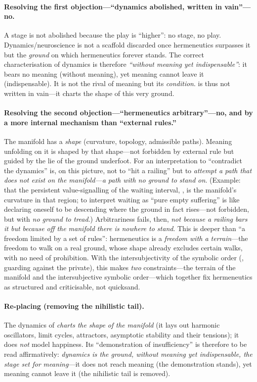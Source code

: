 \paragraph{Resolving the first objection---``dynamics abolished, written in vain''---no.} A stage is not abolished because the play is ``higher'': no stage, no play. Dynamics/neuroscience is not a scaffold discarded once hermeneutics surpasses it but the \emph{ground} on which hermeneutics forever stands. The correct characterisation of dynamics is therefore \emph{``without meaning yet indispensable''}: it bears no meaning (without meaning), yet meaning cannot leave it (indispensable). It is not the rival of meaning but its \emph{condition}.  is thus not written in vain---it charts the shape of this very ground.

\paragraph{Resolving the second objection---``hermeneutics arbitrary''---no, and by a more internal mechanism than ``external rules.''} The manifold has a \emph{shape} (curvature, topology, admissible paths). Meaning unfolding on it is shaped by that shape---not forbidden by external rule but guided by the lie of the ground underfoot. For an interpretation to ``contradict the dynamics'' is, on this picture, not to ``hit a railing'' but to \emph{attempt a path that does not exist on the manifold---a path with no ground to stand on}. (Example: that the persistent value-signalling of the waiting interval, , is the manifold's curvature in that region; to interpret waiting as ``pure empty suffering'' is like declaring oneself to be descending where the ground in fact rises---not forbidden, but with \emph{no ground to tread}.) Arbitrariness fails, then, \emph{not because a railing bars it but because off the manifold there is nowhere to stand}. This is deeper than ``a freedom limited by a set of rules'': hermeneutics is a \emph{freedom with a terrain}---the freedom to walk on a real ground, whose shape already excludes certain walks, with no need of prohibition. With the intersubjectivity of the symbolic order (, guarding against the private), this makes \emph{two} constraints---the terrain of the manifold and the intersubjective symbolic order---which together fix hermeneutics as structured and criticisable, not quicksand.

\paragraph{Re-placing  (removing the nihilistic tail).} The dynamics of  \emph{charts the shape of the manifold} (it lays out harmonic oscillators, limit cycles, attractors, asymptotic stability and their tensions); it does \emph{not} model happiness. Its ``demonstration of insufficiency'' is therefore to be read affirmatively: \emph{dynamics is the ground, without meaning yet indispensable, the stage set for meaning}---it does not reach meaning (the demonstration stands), yet meaning cannot leave it (the nihilistic tail is removed).

